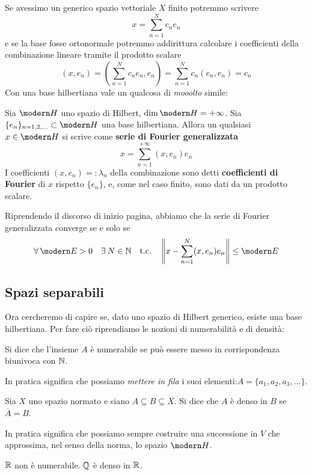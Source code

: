Se avessimo un generico spazio vettoriale $X$ finito potremmo scrivere
$$
x=\sum_{n=1}^Nc_ne_n
$$
e se la base fosse ortonormale potremmo addirittura calcolare i coefficienti della combinazione lineare tramite il prodotto scalare
$$
(x,e_n)=\left(\sum_{n=1}^Nc_ne_n,e_n\right)=\sum_{n=1}^Nc_n(e_n,e_n)=c_n
$$
Con una base hilbertiana vale un qualcosa di \textit{mooolto} simile:
\begin{thm}
\label{teoHNOsepa}
Sia $\Hc$ uno spazio di Hilbert, $\dim \Hc=+\infty$. Sia $\{e_n\}_{n=1,2,\dots}\subset \Hc$ una base hilbertiana. Allora un qualsiasi $x\in \Hc$ si scrive come \textbf{serie di Fourier generalizzata}
\begin{equation*}
\boxed{x = \sum^{+\infty}_{n = 1}(x, e_{n}) e_{n}}
\end{equation*}
I coefficienti $(x,e_n)=:\lambda_n$ della combinazione sono detti \textbf{coefficienti di Fourier} di $x$ rispetto $\{e_n\}$, e, come nel caso finito, sono dati da un prodotto scalare.
\end{thm}

Riprendendo il discorso di inizio pagina, abbiamo che la serie di Fourier generalizzata converge se e solo se
$$
\forall\Ec>0 \quad \exists N\in \NN \quad \text{t.c.}\quad \left\|x-\sum_{n=1}^N(x,e_n)e_n\right\|\leq \Ec
$$


\subsection{Spazi separabili} %
\label{sub:spazi_separabili}

Ora cercheremo di capire se, dato uno spazio di Hilbert generico, esiste una base hilbertiana. Per fare ciò riprendiamo le nozioni di numerabilità e di densità:

\begin{defn}
Si dice che l'insieme $A$ è numerabile se può essere messo in corrispondenza biunivoca con $\mathbb{N}$.
\end{defn}
In pratica significa che possiamo \textit{mettere in fila} i suoi elementi:$A=\{a_1,a_2,a_3,\dots\}$.
\begin{defn}
Sia $X$ uno spazio normato e siano $A\subseteq B\subseteq X$. Si dice che $A$ è denso in $B$ se $\overline{A}=B$.
\end{defn}
In pratica significa che possiamo sempre costruire una successione in $V$ che approssima, nel senso della norma, lo spazio $\Hc$.
\begin{exa}
$\mathbb{R}$ non è numerabile. $\mathbb{Q}$ è denso in $\mathbb{R}$.
\end{exa}

